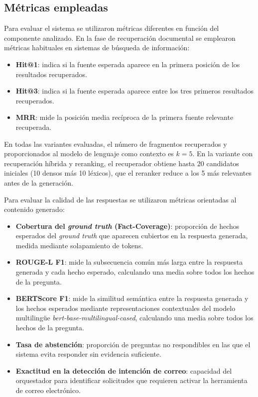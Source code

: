 \subsection{Métricas empleadas}\label{subsec:metricas}

Para evaluar el sistema se utilizaron métricas diferentes en función del componente analizado. 
En la fase de recuperación documental se emplearon métricas habituales en sistemas de búsqueda de información:

\begin{itemize}
	\item \textbf{Hit@1}: indica si la fuente esperada aparece en la primera posición de los resultados recuperados.
	\item \textbf{Hit@3}: indica si la fuente esperada aparece entre los tres primeros resultados recuperados.
	\item \textbf{MRR}: mide la posición media recíproca de la primera fuente relevante recuperada.
\end{itemize}

En todas las variantes evaluadas, el número de fragmentos recuperados y proporcionados al modelo de lenguaje como contexto es $k = 5$. 
En la variante con recuperación híbrida y reranking, el recuperador obtiene hasta 20 candidatos iniciales (10 densos más 10 léxicos), que el reranker reduce a los 5 más relevantes antes de la generación.

Para evaluar la calidad de las respuestas se utilizaron métricas orientadas al contenido generado:

\begin{itemize}
	\item \textbf{Cobertura del \textit{ground truth} (Fact-Coverage)}: proporción de hechos esperados del \textit{ground truth} que aparecen cubiertos en la respuesta generada, medida mediante solapamiento de tokens.
	\item \textbf{ROUGE-L F1}: mide la subsecuencia común más larga entre la respuesta generada y cada hecho esperado, calculando una media sobre todos los hechos de la pregunta.
	\item \textbf{BERTScore F1}: mide la similitud semántica entre la respuesta generada y los hechos esperados mediante representaciones contextuales del modelo multilingüe \textit{bert-base-multilingual-cased}, calculando una media sobre todos los hechos de la pregunta.
	\item \textbf{Tasa de abstención}: proporción de preguntas no respondibles en las que el sistema evita responder sin evidencia suficiente.
	\item \textbf{Exactitud en la detección de intención de correo}: capacidad del orquestador para identificar solicitudes que requieren activar la herramienta de correo electrónico.
\end{itemize}

